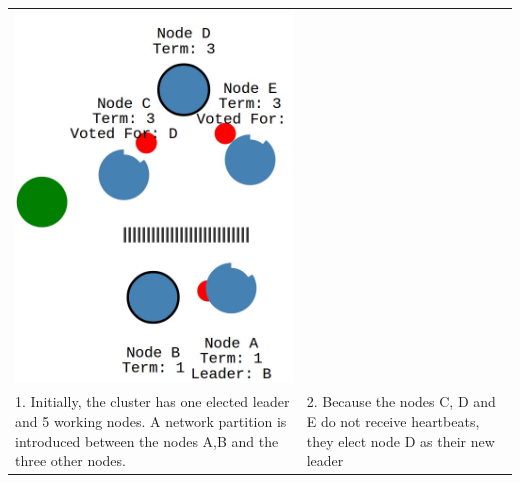 \begin{tabularx}{\textwidth}{ |X|X| }
  \includegraphics[scale=0.28]{scenarios/network_partition/0749.png} \\
  1. Initially, the cluster has one elected leader and 5 working nodes. A network partition is introduced between the nodes A,B and the three other nodes.  &
  2. Because the nodes C, D and E do not receive heartbeats, they elect node D as their new leader \\
  \hline

\end{tabularx}

